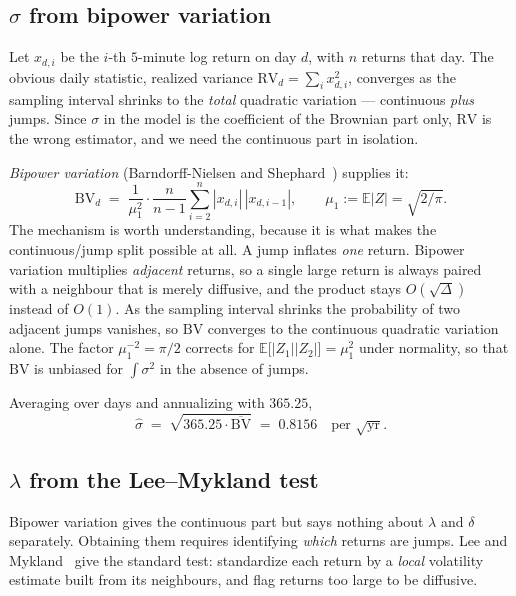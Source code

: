 \documentclass[11pt]{article}
\theoremstyle{definition}
\theoremstyle{remark}
\newcommand{\E}{\mathbb{E}}
\newcommand{\1}{\mathbf{1}}
\begin{document}
\subsection{\texorpdfstring{$\sigma$}{sigma} from bipower variation}

Let $x_{d,i}$ be the $i$-th $5$-minute log return on day $d$, with $n$ returns that day. The obvious daily statistic, realized variance $\mathrm{RV}_d = \sum_i x_{d,i}^2$, converges as the sampling interval shrinks to the \emph{total} quadratic variation --- continuous \emph{plus} jumps. Since $\sigma$ in the model is the coefficient of the Brownian part only, $\mathrm{RV}$ is the wrong estimator, and we need the continuous part in isolation.

\emph{Bipower variation} (Barndorff-Nielsen and Shephard~\cite{bns2004power}) supplies it:
\begin{equation}\label{eq:bpv}
\mathrm{BV}_d \;=\; \frac{1}{\mu_1^2}\cdot\frac{n}{n-1}\sum_{i=2}^{n}|x_{d,i}|\,|x_{d,i-1}|,
\qquad \mu_1 := \E|Z| = \sqrt{2/\pi}.
\end{equation}
The mechanism is worth understanding, because it is what makes the continuous/jump split possible at all. A jump inflates \emph{one} return. Bipower variation multiplies \emph{adjacent} returns, so a single large return is always paired with a neighbour that is merely diffusive, and the product stays $O(\sqrt{\Delta})$ instead of $O(1)$. As the sampling interval shrinks the probability of two adjacent jumps vanishes, so $\mathrm{BV}$ converges to the continuous quadratic variation alone. The factor $\mu_1^{-2} = \pi/2$ corrects for $\E\big[|Z_1||Z_2|\big] = \mu_1^2$ under normality, so that $\mathrm{BV}$ is unbiased for $\int\sigma^2$ in the absence of jumps.

Averaging over days and annualizing with $365.25$,
\[
\hat\sigma \;=\; \sqrt{365.25\cdot\overline{\mathrm{BV}}} \;=\; \mathbf{0.8156} \quad \text{per } \sqrt{\text{yr}}.
\]

\subsection{\texorpdfstring{$\lambda$}{lambda} from the Lee--Mykland test}

Bipower variation gives the continuous part but says nothing about $\lambda$ and $\delta$ separately. Obtaining them requires identifying \emph{which} returns are jumps. Lee and Mykland~\cite{leemykland2008jumps} give the standard test: standardize each return by a \emph{local} volatility estimate built from its neighbours, and flag returns too large to be diffusive.
\end{document}
